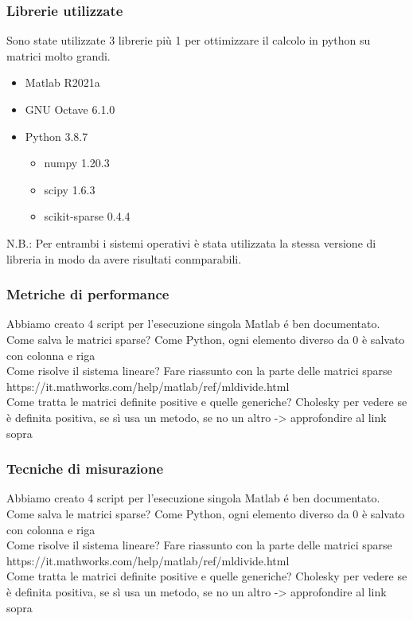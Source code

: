 \documentclass{beamer}
\begin{document}
\begin{frame}
	
	\frametitle{Librerie utilizzate}
	Sono state utilizzate 3 librerie più 1 per ottimizzare il calcolo in python su matrici molto grandi.
	\begin{itemize}
		\item Matlab  R2021a
		\item GNU Octave 6.1.0
		\item Python 3.8.7
		\begin{itemize}
			\item numpy 1.20.3
			\item scipy 1.6.3
			\item scikit-sparse 0.4.4
		\end{itemize}
	\end{itemize}
	N.B.: Per entrambi i sistemi operativi è stata utilizzata la stessa versione di libreria in modo da avere risultati conmparabili.
\end{frame}


\begin{frame}
	
	\frametitle{Metriche di performance}
	Abbiamo creato 4 script per l'esecuzione singola 
	Matlab \'e ben documentato.\\
	Come salva le matrici sparse? Come Python, ogni elemento diverso da 0 è salvato con colonna e riga\\
	Come risolve il sistema lineare? Fare riassunto con la parte delle matrici sparse https://it.mathworks.com/help/matlab/ref/mldivide.html\\
	Come tratta le matrici definite positive e quelle generiche? Cholesky per vedere se è definita positiva, se sì usa un metodo, se no un altro -> approfondire al link sopra
\end{frame}

\begin{frame}
	
	\frametitle{Tecniche di misurazione}
	Abbiamo creato 4 script per l'esecuzione singola 
	Matlab \'e ben documentato.\\
	Come salva le matrici sparse? Come Python, ogni elemento diverso da 0 è salvato con colonna e riga\\
	Come risolve il sistema lineare? Fare riassunto con la parte delle matrici sparse https://it.mathworks.com/help/matlab/ref/mldivide.html\\
	Come tratta le matrici definite positive e quelle generiche? Cholesky per vedere se è definita positiva, se sì usa un metodo, se no un altro -> approfondire al link sopra
\end{frame}
\end{document}
